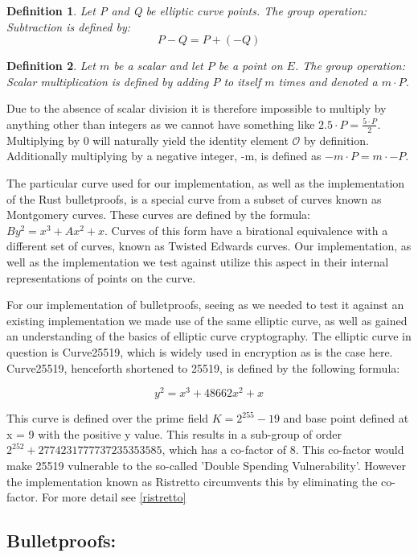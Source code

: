 \documentclass{article}
\newtheorem{definition}{Definition}[section]
\begin{document}
\begin{definition}
	Let P and Q be elliptic curve points. The group operation:
	Subtraction is defined by:
	$$P-Q = P + (-Q)$$
\end{definition}

\begin{definition}
	Let $m$ be a scalar and let $P$ be a point on $E$. The group operation:
	Scalar multiplication is defined by adding $P$ to itself $m$ times and
	denoted a $m\cdot P$.
\end{definition}

Due to the absence of scalar division it is therefore impossible to
multiply by anything other than integers as we cannot have something
like $2.5 \cdot P = \frac{5\cdot P}{2}$. Multiplying by 0 will naturally
yield the identity element $\mathcal{O}$ by definition. Additionally
multiplying by a negative integer, -m, is defined as
$-m\cdot P = m\cdot -P$. 

The particular curve used for our implementation, as well as the
implementation of the Rust bulletproofs, is a special curve from a subset
of curves known as Montgomery curves. These curves are defined by the
formula: $By^2 = x^3 + Ax^2 + x$. Curves of this form have a birational
equivalence with a different set of curves, known as Twisted Edwards
curves. Our implementation, as well as the implementation we test against
utilize this aspect in their internal representations of points on the
curve.

For our implementation of bulletproofs, seeing as we needed to test it
against an existing implementation we made use of the same elliptic
curve, as well as gained an understanding of the basics of elliptic
curve cryptography. The elliptic curve in question is Curve25519, which
is widely used in encryption as is the case here. Curve25519, henceforth
shortened to 25519, is defined by the following formula:

$$y^2 = x^3 + 48662x^2 + x$$

This curve is defined over the prime field $K = 2^{255} - 19$ and base
point defined at x = 9 with the positive y value. This results in a
sub-group of order $2^{252} + 2774231777737235353585$, which has a
co-factor of 8. This co-factor would make 25519 vulnerable to the
so-called 'Double Spending Vulnerability'. However the implementation
known as Ristretto circumvents this by eliminating the co-factor.
For more detail see \ref{ristretto} 

\subsection{Bulletproofs:}\label{Bulletproofs}
\end{document}
